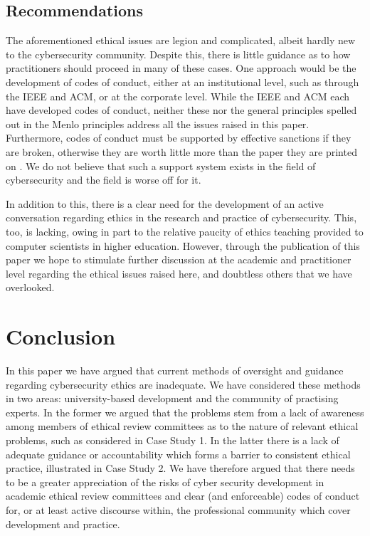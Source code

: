 \documentclass{svjour3}                     %
\begin{document}
\subsection{Recommendations}
\label{sec:recommendations}
The aforementioned ethical issues are legion and complicated, albeit hardly new to the cybersecurity community.  Despite this, there is little guidance as to how practitioners should proceed in many of these cases.  One approach would be the development of codes of conduct, either at an institutional level, such as through the IEEE and ACM, or at the corporate level. While the IEEE and ACM each have developed codes of conduct, neither these nor the general principles spelled out in the Menlo principles address all the issues raised in this paper.  Furthermore, codes of conduct must be supported by effective sanctions if they are broken, otherwise they are worth little more than the paper they are printed on \cite{davis1991thinking}. We do not believe that such a support system exists in the field of cybersecurity and the field is worse off for it.

In addition to this, there is a clear need for the development of an active conversation regarding ethics in the research and practice of cybersecurity.  This, too, is lacking, owing in part to the relative paucity of ethics teaching provided to computer scientists in higher education.  However, through the publication of this paper we hope to stimulate further discussion at the academic and practitioner level regarding the ethical issues raised here, and doubtless others that we have overlooked.

\section{Conclusion}
\label{sec:conclusion}
In this paper we have argued that current methods of oversight and guidance regarding cybersecurity ethics are inadequate. We have considered these methods in two areas: university-based development and the community of practising experts. In the former we argued that the problems stem from a lack of awareness among members of ethical review committees as to the nature of relevant ethical problems, such as considered in Case Study 1. In the latter there is a lack of adequate guidance or accountability which forms a barrier to consistent ethical practice, illustrated in Case Study 2. We have therefore argued that there needs to be a greater appreciation of the risks of cyber security development in academic ethical review committees and clear (and enforceable) codes of conduct for, or at least active discourse within, the professional community which cover development and practice.
\end{document}
